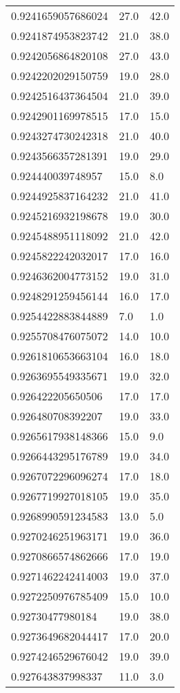 \begin{center}
\begin{supertabular}[H]{p{0.30\textwidth}p{0.05\textwidth}p{0.05\textwidth}}
0.9241659057686024 & 27.0 & 42.0 \\ 
0.9241874953823742 & 21.0 & 38.0 \\ 
0.9242056864820108 & 27.0 & 43.0 \\ 
0.9242202029150759 & 19.0 & 28.0 \\ 
0.9242516437364504 & 21.0 & 39.0 \\ 
0.9242901169978515 & 17.0 & 15.0 \\ 
0.9243274730242318 & 21.0 & 40.0 \\ 
0.9243566357281391 & 19.0 & 29.0 \\ 
0.924440039748957 & 15.0 & 8.0 \\ 
0.9244925837164232 & 21.0 & 41.0 \\ 
0.9245216932198678 & 19.0 & 30.0 \\ 
0.9245488951118092 & 21.0 & 42.0 \\ 
0.9245822242032017 & 17.0 & 16.0 \\ 
0.9246362004773152 & 19.0 & 31.0 \\ 
0.9248291259456144 & 16.0 & 17.0 \\ 
0.9254422883844889 & 7.0 & 1.0 \\ 
0.9255708476075072 & 14.0 & 10.0 \\ 
0.9261810653663104 & 16.0 & 18.0 \\ 
0.9263695549335671 & 19.0 & 32.0 \\ 
0.926422205650506 & 17.0 & 17.0 \\ 
0.926480708392207 & 19.0 & 33.0 \\ 
0.9265617938148366 & 15.0 & 9.0 \\ 
0.9266443295176789 & 19.0 & 34.0 \\ 
0.9267072296096274 & 17.0 & 18.0 \\ 
0.9267719927018105 & 19.0 & 35.0 \\ 
0.9268990591234583 & 13.0 & 5.0 \\ 
0.9270246251963171 & 19.0 & 36.0 \\ 
0.9270866574862666 & 17.0 & 19.0 \\ 
0.9271462242414003 & 19.0 & 37.0 \\ 
0.9272250976785409 & 15.0 & 10.0 \\ 
0.92730477980184 & 19.0 & 38.0 \\ 
0.9273649682044417 & 17.0 & 20.0 \\ 
0.9274246529676042 & 19.0 & 39.0 \\ 
0.927643837998337 & 11.0 & 3.0 \\ 

\end{supertabular}
\end{center}
